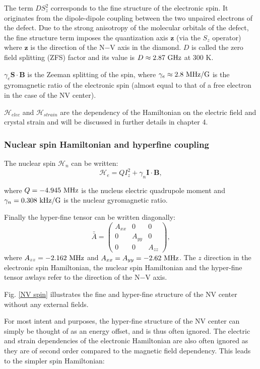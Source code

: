 \documentclass[a4paper,11pt]{report}
\begin{document}
The term $D S_z^2$ corresponds to the fine structure of the electronic spin. It originates from the dipole-dipole coupling between the two unpaired electrons of the defect. Due to the strong anisotropy of the molecular orbitals of the defect, the fine structure term imposes the quantization axis $\mathbf{z}$ (via the $S_z$ operator) where $\mathbf{z}$ is the direction of the N$-$V axis in the diamond. $D$ is called the zero field splitting (ZFS) factor and its value is $D\approx 2.87\ \rm GHz$ at 300 K.

$\gamma_e \mathbf{S} \cdot \mathbf{B}$ is the Zeeman splitting of the spin, where $\gamma_e \approx 2.8\ \rm MHz/G$ is the gyromagnetic ratio of the electronic spin (almost equal to that of a free electron in the case of the NV center).

$\mathcal{H}_{elec}$ and $\mathcal{H}_{strain}$ are the dependency of the Hamiltonian on the electric field and crystal strain and will be discussed in further details in chapter 4.

\subsubsection{Nuclear spin Hamiltonian and hyperfine coupling}
The nuclear spin $\mathcal{H}_n$ can be written:
\begin{equation}
\mathcal{H}_e=Q I_z^2 + \gamma_n \mathbf{I} \cdot \mathbf{B},
\end{equation}

where $Q=-4.945\ \rm MHz$ is the nucleus electric quadrupole moment and $\gamma_n=0.308\ \rm kHz/G$ is the nuclear gyromagnetic ratio.

Finally the hyper-fine tensor can be written diagonally:
\begin{equation}
\bar{\bar{A}} = \begin{pmatrix}
A_{xx} & 0 & 0 \\
0 & A_{yy} & 0 \\
0 & 0 & A_{zz}
\end{pmatrix},
\end{equation}
where $A_{zz}=-2.162\ \rm MHz$ and $A_{xx}=A_{yy}=-2.62\ \rm MHz$. The $z$ direction in the electronic spin Hamiltonian, the nuclear spin Hamiltonian and the hyper-fine tensor awlays refer to the direction of the N$-$V axis.

Fig. \ref{NV spin} illustrates the fine and hyper-fine structure of the NV center without any external fields.

For most intent and purposes, the hyper-fine structure of the NV center can simply be thought of as an energy offset, and is thus often ignored. The electric and strain dependencies of the electronic Hamiltonian are also often ignored as they are of second order compared to the magnetic field dependency. This leads to the simpler spin Hamiltonian:
\end{document}
